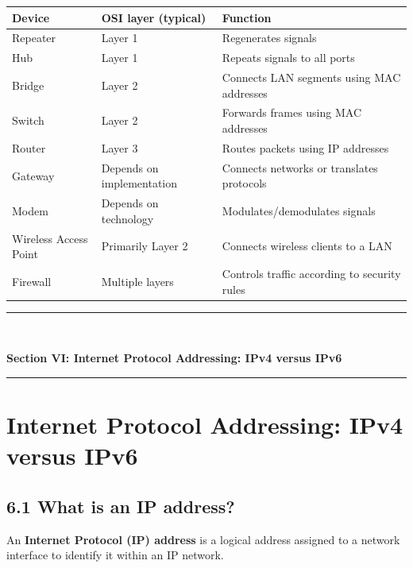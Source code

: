 \begin{table}[htbp]
\centering
\begin{tabularx}{\textwidth}{p{4.2cm} X X}
\toprule
\textbf{Device} & \textbf{OSI layer (typical)} & \textbf{Function} \\
\midrule
Repeater & Layer 1 & Regenerates signals \\
Hub & Layer 1 & Repeats signals to all ports \\
Bridge & Layer 2 & Connects LAN segments using MAC addresses \\
Switch & Layer 2 & Forwards frames using MAC addresses \\
Router & Layer 3 & Routes packets using IP addresses \\
Gateway & Depends on implementation & Connects networks or translates protocols \\
Modem & Depends on technology & Modulates/demodulates signals \\
Wireless Access Point & Primarily Layer 2 & Connects wireless clients to a LAN \\
Firewall & Multiple layers & Controls traffic according to security rules \\
\bottomrule
\end{tabularx}
\end{table}


\newpage

\newpage
\begin{center}
\vspace{0.5em}
{\color{primary}\rule{0.45\textwidth}{1.2pt}\\[4pt]}
{\Large\bfseries\color{primary} Section VI: Internet Protocol Addressing: IPv4 versus IPv6\\[2pt]}
{\color{primary}\rule{0.45\textwidth}{1.2pt}}
\vspace{0.5em}
\end{center}

\section{Internet Protocol Addressing: IPv4 versus IPv6}

\subsection{6.1 What is an IP address?}

An \textbf{Internet Protocol (IP) address} is a logical address assigned to a network interface to identify it within an IP network.

